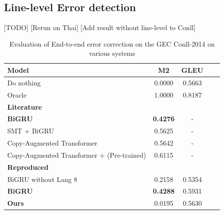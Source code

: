 
\subsection*{Line-level Error detection}
[TODO] [Rerun on Thai] [Add result without line-level to Conll]

\begin{table}
  \caption{Evaluation of End-to-end error correction on the GEC Conll-2014 on various systems}
  \label{tab:e2e_conll_all}
  \begin{tabular}{lcccc}
    \toprule
    Model & M2 & GLEU \\
    \midrule
    Do nothing & 0.0000 & 0.5663 \\
    Oracle & 1.0000 & 0.8187 \\
    \midrule
    \textbf{Literature} & \\
    \textbf{BiGRU} & \textbf{0.4276} & - \\
    SMT + BiGRU & 0.5625 & - \\
    Copy-Augmented Transformer & 0.5642	& - \\
    Copy-Augmented Transformer + (Pre-trained) & 0.6115 & - \\
    \midrule
    \textbf{Reproduced} & \\
    BiGRU without Lang 8 & 0.2158 & 0.5354 \\
    \textbf{BiGRU} & \textbf{0.4288} & 0.5931 \\
    \midrule
    \textbf{Ours} & 0.0195 & 0.5630 \\
    \bottomrule
\end{tabular}
\end{table}


